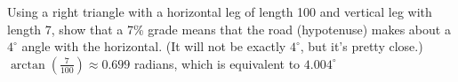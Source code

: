 { Using a right triangle with a horizontal leg of length 100 and vertical leg with length 7, show that a 7\% grade means that the road (hypotenuse) makes about a $4^{\circ}$ angle with the horizontal.  (It will not be exactly $4^{\circ}$, but it's pretty close.) \label{firstroadgrade}}
{$\arctan\left(\frac{7}{100}\right) \approx 0.699$ radians, which is equivalent to $4.004^{\circ}$}

